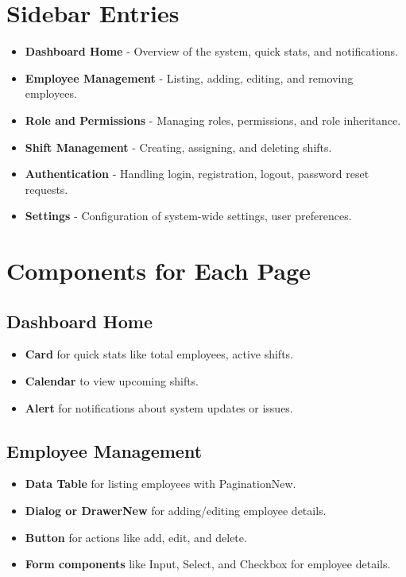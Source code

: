 \documentclass{article}
\begin{document}
\section{Sidebar Entries}

\begin{itemize}
    \item \textbf{Dashboard Home} - Overview of the system, quick stats, and notifications.
    \item \textbf{Employee Management} - Listing, adding, editing, and removing employees.
    \item \textbf{Role and Permissions} - Managing roles, permissions, and role inheritance.
    \item \textbf{Shift Management} - Creating, assigning, and deleting shifts.
    \item \textbf{Authentication} - Handling login, registration, logout, password reset requests.
    \item \textbf{Settings} - Configuration of system-wide settings, user preferences.
\end{itemize}

\section{Components for Each Page}

\subsection{Dashboard Home}

\begin{itemize}
    \item \textbf{Card} for quick stats like total employees, active shifts.
    \item \textbf{Calendar} to view upcoming shifts.
    \item \textbf{Alert} for notifications about system updates or issues.
\end{itemize}

\subsection{Employee Management}

\begin{itemize}
    \item \textbf{Data Table} for listing employees with PaginationNew.
    \item \textbf{Dialog or DrawerNew} for adding/editing employee details.
    \item \textbf{Button} for actions like add, edit, and delete.
    \item \textbf{Form components} like Input, Select, and Checkbox for employee details.
\end{itemize}
\end{document}
